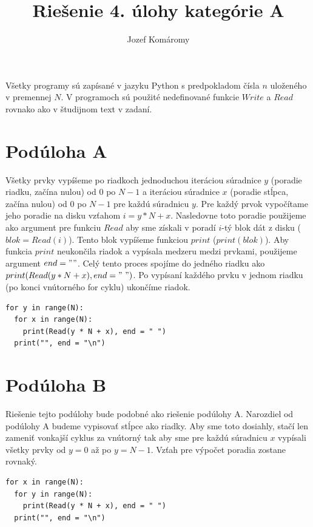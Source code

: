 \documentclass{article}
\begin{document}
\title{Riešenie 4. úlohy kategórie A}
\author{Jozef Komáromy}

\maketitle


Všetky programy sú zapísané v jazyku Python s predpokladom čísla $n$ uloženého v premennej $N$. V programoch sú použité nedefinované funkcie $Write$ a $Read$ rovnako ako v študijnom text v zadaní.

\section*{Podúloha A}

Všetky prvky vypíšeme po riadkoch jednoduchou iteráciou súradnice $y$ (poradie riadku, začína nulou) od $0$ po $N-1$ a iteráciou súradnice $x$ (poradie stĺpca, začína nulou) od $0$ po $N-1$ pre každú súradnicu $y$. Pre každý prvok vypočítame jeho poradie na disku vzťahom $i = y * N + x$. Nasledovne toto poradie použijeme ako argument pre funkciu $Read$ aby sme získali v poradí $i$-tý blok dát z disku ($blok = Read(i)$). Tento blok vypíšeme funkciou $print$ (\(print(blok)\)). Aby funkcia $print$ neukončila riadok a vypísala medzeru medzi prvkami, použijeme argument \(end = " "\). Celý tento proces spojíme do jedného riadku ako \(print(Read(y * N + x), end = "\ ")\). Po vypísaní každého prvku v jednom riadku (po konci vnútorného for cyklu) ukončíme riadok.

\begin{lstlisting}
for y in range(N):
  for x in range(N):
    print(Read(y * N + x), end = " ")
  print("", end = "\n")
\end{lstlisting}

\section*{Podúloha B}

Riešenie tejto podúlohy bude podobné ako riešenie podúlohy A. Narozdiel od podúlohy A budeme vypisovať stĺpce ako riadky. Aby sme toto dosiahly, stačí len zameniť vonkajší cyklus za vnútorný tak aby sme pre každú súradnicu $x$ vypísali všetky prvky od $y = 0$ až po $y = N-1$. Vzťah pre výpočet poradia zostane rovnaký.

\begin{lstlisting}
for x in range(N):
  for y in range(N):
    print(Read(y * N + x), end = " ")
  print("", end = "\n")
\end{lstlisting}
\end{document}

